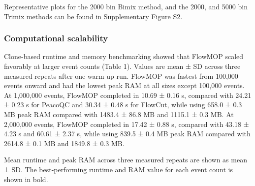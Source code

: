 \documentclass[ASNA]{latex/wiley/USG}
\begin{document}
Representative plots for the 2000 bin Bimix method, and the 2000, and
5000 bin Trimix methods can be found in Supplementary Figure S2.

\subsubsection{Computational
scalability}\label{computational-scalability}

Clone-based runtime and memory benchmarking showed that FlowMOP scaled
favorably at larger event counts (Table 1). Values are mean ± SD across
three measured repeats after one warm-up run. FlowMOP was fastest from
100,000 events onward and had the lowest peak RAM at all sizes except
100,000 events. At 1,000,000 events, FlowMOP completed in 10.69 ± 0.16
s, compared with 24.21 ± 0.23 s for PeacoQC and 30.34 ± 0.48 s for
FlowCut, while using 658.0 ± 0.3 MB peak RAM compared with 1483.4 ± 86.8
MB and 1115.1 ± 0.3 MB. At 2,000,000 events, FlowMOP completed in 17.42
± 0.88 s, compared with 43.18 ± 4.23 s and 60.61 ± 2.37 s, while using
839.5 ± 0.4 MB peak RAM compared with 2614.8 ± 0.1 MB and 1849.8 ± 0.3
MB.

\clearpage
\begingroup
\scriptsize
\setlength{\tabcolsep}{2pt}
\renewcommand{\arraystretch}{1.10}

\captionsetup{type=table}
\begingroup
\renewcommand{\thetable}{1}
\endgroup

Mean runtime and peak RAM across three measured repeats are shown as
mean ± SD. The best-performing runtime and RAM value for each event
count is shown in bold.
\end{document}
